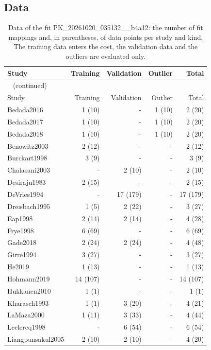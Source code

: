 \documentclass{article}
\begin{document}
\subsection{Data}

\begin{longtable}{lrrrr}
\caption{Data of the fit PK\_20261020\_035132\_\_b4a12: the number of fit mappings and, in parentheses, of data points per study and kind. The training data enters the cost, the validation data and the outliers are evaluated only.}\label{tab:data:PK_20261020_035132__b4a12} \\
\toprule
Study & Training & Validation & Outlier & Total \\
\midrule
\endfirsthead
\multicolumn{5}{l}{\small\tablename~\thetable{} (continued)} \\
\toprule
Study & Training & Validation & Outlier & Total \\
\midrule
\endhead
\bottomrule
\endlastfoot
Bedada2016 & 1 (10) & - & 1 (10) & 2 (20) \\
Bedada2017 & 1 (10) & - & 1 (10) & 2 (20) \\
Bedada2018 & 1 (10) & - & 1 (10) & 2 (20) \\
Benowitz2003 & 2 (12) & - & - & 2 (12) \\
Burckart1998 & 3 (9) & - & - & 3 (9) \\
Chalasani2003 & - & 2 (10) & - & 2 (10) \\
Desiraju1983 & 2 (15) & - & - & 2 (15) \\
DeVries1994 & - & 17 (179) & - & 17 (179) \\
Dreisbach1995 & 1 (5) & 2 (22) & - & 3 (27) \\
Eap1998 & 2 (14) & 2 (14) & - & 4 (28) \\
Frye1998 & 6 (69) & - & - & 6 (69) \\
Gade2018 & 2 (24) & 2 (24) & - & 4 (48) \\
Girre1994 & 3 (27) & - & - & 3 (27) \\
He2019 & 1 (13) & - & - & 1 (13) \\
Hohmann2019 & 14 (107) & - & - & 14 (107) \\
Hukkanen2010 & 1 (1) & - & - & 1 (1) \\
Kharasch1993 & 1 (1) & 3 (20) & - & 4 (21) \\
LaMaza2000 & 1 (11) & 3 (33) & - & 4 (44) \\
Leclercq1998 & - & 6 (54) & - & 6 (54) \\
Liangpunsakul2005 & 2 (10) & 2 (10) & - & 4 (20) \\

\end{longtable}
\end{document}
